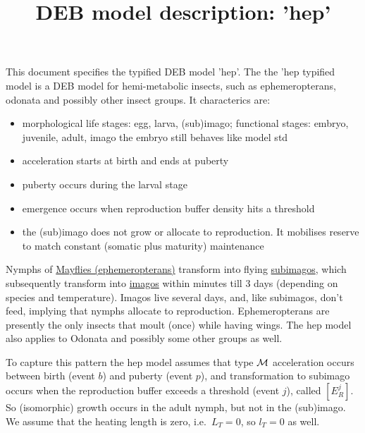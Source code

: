 \documentclass{article}
\title{DEB model description: 'hep'}
\begin{document}
\maketitle

This document specifies the typified DEB model \citep{MarqAugu2018} 'hep'.
The the 'hep typified model is a DEB model for hemi-metabolic insects, such as ephemeropterans, odonata and possibly other insect groups. It characterics are:
\begin{itemize}
\item morphological life stages: egg, larva, (sub)imago; functional stages: embryo, juvenile, adult, imago
    the embryo still behaves like model std
\item acceleration starts at birth and ends at puberty
\item  puberty occurs during the larval stage
\item emergence occurs when reproduction buffer density hits a threshold
\item the (sub)imago does not grow or allocate to reproduction. It mobilises reserve to match constant (somatic plus maturity) maintenance
\end{itemize}
Nymphs of \href{https://en.wikipedia.org/wiki/Mayfly}{Mayflies (ephemeropterans)} transform into flying \href{https://en.wikipedia.org/wiki/Mayfly#Subimago}{subimagos}, which subsequently transform into \href{https://en.wikipedia.org/wiki/Imago}{imagos} within minutes till 3 days (depending on species and temperature).
Imagos live several days, and, like subimagos, don't feed, implying that nymphs allocate to reproduction.
Ephemeropterans are presently the only insects that moult (once) while having wings.
The hep model also applies to Odonata and possibly some other groups as well.

To capture this pattern the hep model assumes that type $\cal M$ acceleration \citep[section 3.3]{Kooy2014} occurs between birth (event $b$) and puberty (event $p$), and transformation to subimago occurs when the reproduction buffer exceeds a threshold (event $j$), called $[E_R^j]$. 
So (isomorphic) growth occurs in the adult nymph, but not in the (sub)imago.
We assume that the heating length is zero, i.e.\ $L_T = 0$, so $l_T = 0$ as well.
\end{document}

